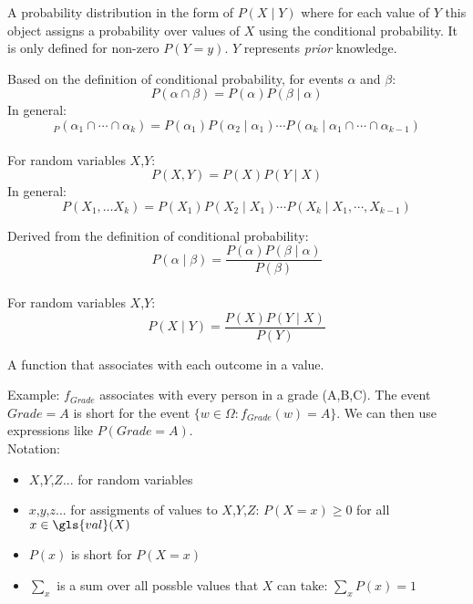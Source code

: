{%
  A \gls{probability distribution} in the form of $P(X\mid Y)$ where for each value of $Y$ this object assigns a probability over values of $X$ using the \gls{conditional probability}. It is only defined for non-zero $P(Y=y)$. $Y$ represents \textit{prior} knowledge.
}


{%
  Based on the definition of \gls{conditional probability}, for events $\alpha$ and $\beta$:
  \begin{equation*}
    P(\alpha\cap\beta)=P(\alpha)P(\beta\mid\alpha)
  \end{equation*}
  In general:
  \begin{equation*}
    _P(\alpha_1\cap\cdots\cap\alpha_k)=P(\alpha_1)P(\alpha_2\mid\alpha_1)\cdots P(\alpha_k\mid\alpha_1\cap\cdots\cap\alpha_{k-1})
  \end{equation*}\\[0.1cm]
  For \glspl{random variable} $X$,$Y$:
  \begin{equation*}
    P(X,Y)=P(X)P(Y\mid X)
  \end{equation*}
  In general:
  \begin{equation*}
    P(X_1,\dots X_k)=P(X_1)P(X_2\mid X_1)\cdots P(X_k\mid X_1,\cdots,X_{k-1})
  \end{equation*}

}

{%
  Derived from the definition of \gls{conditional probability}:
  \begin{equation*}
    P(\alpha\mid\beta)=\frac{P(\alpha)P(\beta\mid\alpha)}{P(\beta)}
  \end{equation*}\\[0.1cm]

  For \glspl{random variable} $X$,$Y$:
  \begin{equation*}
    P(X\mid Y)=\frac{P(X)P(Y\mid X)}{P(Y)}
  \end{equation*}
}

{%
  A function that associates with each outcome in  a value.

  Example: $f_{Grade}$ associates with every person in  a grade (A,B,C). The event $Grade=A$ is short for the event $\{w\in\Omega:f_{Grade}(w)=A\}$. We can then use expressions like $P(Grade=A)$.\\

  Notation:
  \begin{itemize}
    \item $X$,$Y$,$Z$... for random variables
    \item $x$,$y$,$z$... for assigments of values to  $X$,$Y$,$Z$: $P(X=x)\geq0 $ for all $x\in \gls{val}(X)$
    \item $P(x)$ is short for $P(X=x)$
    \item $\sum_x$ is a sum over all possble values that $X$ can take: $\sum_xP(x)=1$
  \end{itemize}
}

